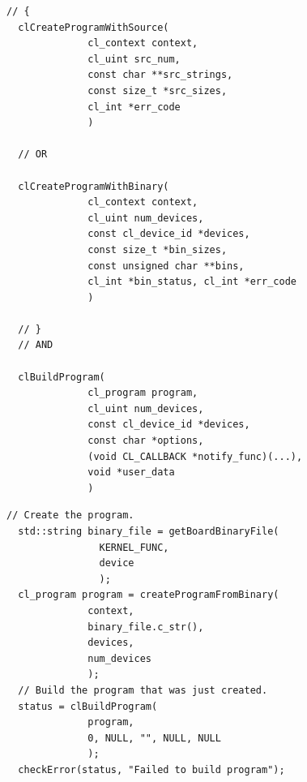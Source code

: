 \documentclass{article}
\begin{document}
  \begin{lstlisting}[title={Normal Use}]
  // {
  clCreateProgramWithSource(
              cl_context context,
              cl_uint src_num,
              const char **src_strings,
              const size_t *src_sizes,
              cl_int *err_code
              )
  
  // OR

  clCreateProgramWithBinary(
              cl_context context,
              cl_uint num_devices,
              const cl_device_id *devices,
              const size_t *bin_sizes,
              const unsigned char **bins,
              cl_int *bin_status, cl_int *err_code
              )

  // }
  // AND
  
  clBuildProgram(
              cl_program program,
              cl_uint num_devices,
              const cl_device_id *devices,
              const char *options,
              (void CL_CALLBACK *notify_func)(...),
              void *user_data
              )
  \end{lstlisting}

  \begin{lstlisting}[title={Intel Altera use}]
  // Create the program.
  std::string binary_file = getBoardBinaryFile(
                KERNEL_FUNC,
                device
                );
  cl_program program = createProgramFromBinary(
              context,
              binary_file.c_str(),
              devices,
              num_devices
              );
  // Build the program that was just created.
  status = clBuildProgram(
              program,
              0, NULL, "", NULL, NULL
              );
  checkError(status, "Failed to build program");
  \end{lstlisting}
\end{document}
